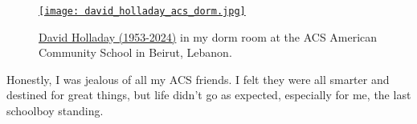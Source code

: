 \captionsetup[figure]{labelformat=empty}
\begin{SCfigure}
\centering
\href{https://conceptcontrol.smugmug.com/Places/Overseas/Beirut-Lebanon-1960s-1/i-4v89f4D/A}{\texttt{[image: david\_holladay\_acs\_dorm.jpg]}}
\caption[David Holladay (1953-2024)]{\href{https://en.wikipedia.org/wiki/David_Holladay}{David Holladay (1953-2024)} in my dorm room at the ACS American Community
School in Beirut, Lebanon.}
\label{fig:8196x3}
\end{SCfigure}

Honestly, I was jealous of all my ACS friends. I felt they were all
smarter and destined for great things, but life didn't go as expected,
especially for me, the last schoolboy standing.

%

